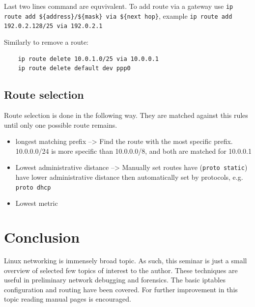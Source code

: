 \documentclass[times, utf8, seminar, english]{fer}
\begin{document}
Last two lines command are equvivalent. To add route via a gateway use \verb|ip route add ${address}/${mask} via ${next hop}|, example
\verb|ip route add 192.0.2.128/25 via 192.0.2.1|

Similarly to remove a route:
\begin{verbatim}
    ip route delete 10.0.1.0/25 via 10.0.0.1
    ip route delete default dev ppp0
\end{verbatim}

\section{Route selection}
\label{sec:route-sel}
Route selection is done in the following way. They are matched against this rules until only one possible route remains.
\begin{itemize}
    \item longest matching prefix --> Find the route with the most specific prefix. 10.0.0.0/24 is more specific than 10.0.0.0/8, and both are matched for 10.0.0.1
    \item Lowest administrative distance --> Manually set routes have (\verb|proto static|) have lower administrative distance then automatically set by protocols, e.g. \verb|proto dhcp|
    \item Lowest metric
\end{itemize}

\chapter{Conclusion}

Linux networking is immensely broad topic. As such, this seminar is just a small overview of selected few topics of interest to the author. These techniques are useful in preliminary network debugging and forensics. The basic iptables configuration and routing have been covered. For further improvement in this topic reading manual pages is encouraged.



\end{document}
